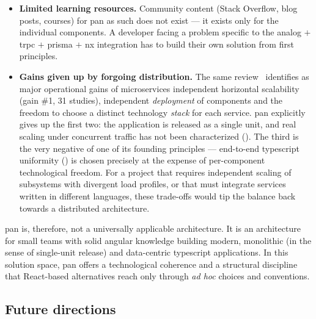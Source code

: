 \begin{itemize}
  \item \textbf{Limited learning resources.} Community content (Stack Overflow, blog posts, courses) for \gls{pan} as such does not exist --- it exists only for the individual components. A developer facing a problem specific to the \gls{analog} \(+\) \gls{trpc} \(+\) \gls{prisma} \(+\) \gls{nx} integration has to build their own solution from first principles.

  \item \textbf{Gains given up by forgoing distribution.} The same review~\cite{soldani2018} identifies as major operational gains of microservices independent horizontal scalability (gain \#1, 31 studies), independent \textit{deployment} of components and the freedom to choose a distinct technology \textit{stack} for each service. \gls{pan} explicitly gives up the first two: the application is released as a single unit, and real scaling under concurrent traffic has not been characterized (). The third is the very negative of one of its founding principles --- end-to-end \gls{typescript} uniformity () is chosen precisely at the expense of per-component technological freedom. For a project that requires independent scaling of subsystems with divergent load profiles, or that must integrate services written in different languages, these trade-offs would tip the balance back towards a distributed architecture.
\end{itemize}

\gls{pan} is, therefore, not a universally applicable architecture.
It is an architecture for small teams with solid \gls{angular} knowledge building modern, monolithic (in the sense of single-unit release) and data-centric \gls{typescript} applications.
In this solution space, \gls{pan} offers a technological coherence and a structural discipline that React-based alternatives reach only through \textit{ad hoc} choices and conventions.

\subsection{Future directions}\label{sec:directii-viitoare}

